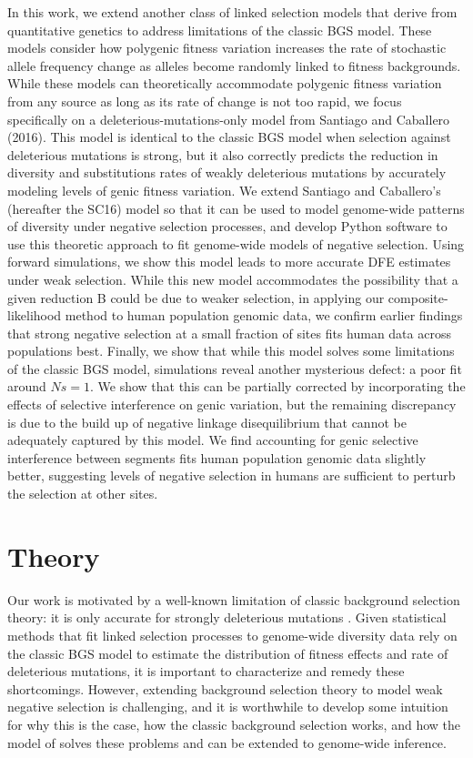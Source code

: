 \documentclass[11pt]{article}
\begin{document}
In this work, we extend another class of linked selection models that derive
from quantitative genetics to address limitations of the classic BGS model.
These models consider how polygenic fitness variation increases the rate of
stochastic allele frequency change as alleles become randomly linked to fitness
backgrounds. While these models can theoretically accommodate polygenic fitness
variation from any source as long as its rate of change is not too rapid, we
focus specifically on a deleterious-mutations-only model from Santiago and
Caballero (2016). This model is identical to the classic BGS model when
selection against deleterious mutations is strong, but it also correctly
predicts the reduction in diversity and substitutions rates of weakly
deleterious mutations by accurately modeling levels of genic fitness variation.
We extend Santiago and Caballero’s (hereafter the SC16) model so that it can be
used to model genome-wide patterns of diversity under negative selection
processes, and develop Python software to use this theoretic approach to fit
genome-wide models of negative selection. Using forward simulations, we show
this model leads to more accurate DFE estimates under weak selection. While
this new model accommodates the possibility that a given reduction B could be
due to weaker selection, in applying our composite-likelihood method to human
population genomic data, we confirm earlier findings that strong negative
selection at a small fraction of sites fits human data across populations best.
Finally, we show that while this model solves some limitations of the classic
BGS model, simulations reveal another mysterious defect: a poor fit around
$Ns=1$. We show that this can be partially corrected by incorporating the effects
of selective interference on genic variation, but the remaining discrepancy is
due to the build up of negative linkage disequilibrium that cannot be
adequately captured by this model. We find accounting for genic selective
interference between segments fits human population genomic data slightly
better, suggesting levels of negative selection in humans are sufficient to
perturb the selection at other sites.

\section*{Theory}

Our work is motivated by a well-known limitation of classic background
selection theory: it is only accurate for strongly deleterious mutations
\parencite{Charlesworth1993-gb,McVean2000-bt,Good2013-lp,Gordo2002-dr}. Given
statistical methods that fit linked selection processes to genome-wide
diversity data rely on the classic BGS model to estimate the distribution of
fitness effects and rate of deleterious mutations, it is important to
characterize and remedy these shortcomings. However, extending background
selection theory to model weak negative selection is challenging, and it is
worthwhile to develop some intuition for why this is the case, how the classic
background selection works, and how the model of \textcite{Santiago2016-mu}
solves these problems and can be extended to genome-wide inference.
\end{document}
